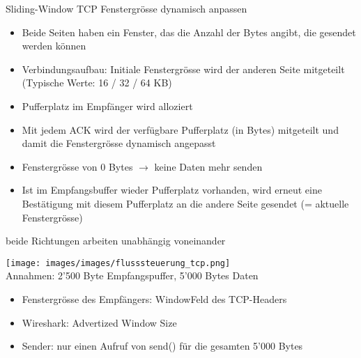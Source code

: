 \begin{KR}{Sliding-Window TCP} Fenstergrösse dynamisch anpassen

    \begin{itemize}
        \item Beide Seiten haben ein Fenster, das die Anzahl der Bytes angibt, die gesendet werden können
        \item Verbindungsaufbau: Initiale Fenstergrösse wird der anderen Seite mitgeteilt (Typische Werte: 16 / 32 / 64 KB)
        \item Pufferplatz im Empfänger wird alloziert
        \item Mit jedem ACK wird der verfügbare Pufferplatz (in Bytes) mitgeteilt und damit die Fenstergrösse dynamisch angepasst
        \item Fenstergrösse von 0 Bytes $\rightarrow$ keine Daten mehr senden
        \item Ist im Empfangsbuffer wieder Pufferplatz vorhanden, wird erneut eine Bestätigung mit diesem Pufferplatz an die andere Seite gesendet (= aktuelle Fenstergrösse)
    \end{itemize}
    {\small beide Richtungen arbeiten unabhängig voneinander}
\end{KR}



\begin{example}
        \texttt{[image: images/images/flusssteuerung\_tcp.png]}\\
    Annahmen: 2'500 Byte Empfangspuffer, 5'000 Bytes Daten
    \begin{itemize}
        \item Fenstergrösse des Empfängers: WindowFeld des TCP-Headers
        \item Wireshark: Advertized Window Size
        \item Sender: nur einen Aufruf von send() für die gesamten 5'000 Bytes
    \end{itemize}
\end{example}



